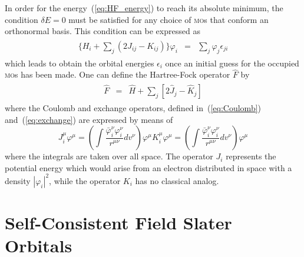 In order for the energy~(\ref{eq:HF_energy}) to reach its absolute
minimum, the condition $\delta E = 0$ must be satisfied for any choice
of \textsc{mo}s that conform an orthonormal basis. This condition can
be expressed as~\cite{Roothaan_HF,Levine_QChem}
%
\begin{eqnarray}
  \begin{split}
    \{H_{i} + \sum\limits_{j} ( 2J_{ij} - K_{ij} ) \} \varphi_{i} & = &
    \sum\limits_{j} \varphi_{j} \epsilon_{ji}
  \end{split}
\label{eq:deltaEzero}
\end{eqnarray}
%
which leads to obtain the orbital energies $\epsilon_{i}$ once an
initial guess for the occupied \textsc{mo}s has been made. One can
define the Hartree-Fock operator $\hat{F}$ by
%
\begin{eqnarray}
  \begin{split}
    \hat{F} & = & \hat{H} +
    \sum\limits_{j} [ 2\hat{J}_{j} - \hat{K}_{j} ]
  \end{split}
  \label{eq:F_operator}
\end{eqnarray}
%
where the Coulomb and exchange operators, defined
in~(\ref{eq:Coulomb}) and~(\ref{eq:exchange}) are expressed by means of
%
\begin{subequations}
  \begin{equation}\label{eq:one_indxJ}
    J_{i}^{\mu} \varphi^{\mu} = \left( \int
    \frac{\bar\varphi_{i}^{\nu} \varphi_{i}^{\nu}}
         {r^{\mu\nu}} dv^{\nu}
         \right) \varphi^{\mu}
  \end{equation}
  \begin{equation}\label{eq:one_indxK}
    K_{i}^{\mu} \varphi^{\mu} = \left( \int
    \frac{\bar\varphi_{i}^{\nu} \varphi_{i}^{\nu}}
         {r^{\mu\nu}} dv^{\nu}
         \right) \varphi^{\mu}
  \end{equation}
\end{subequations}
%
where the integrals are taken over all space. The operator $J_{i}$
represents the potential energy which would arise from an electron
distributed in space with a density $|\varphi_{i}|^{2}$, while the
operator $K_{i}$ has no classical analog.
  




\section{Self-Consistent Field Slater Orbitals}
\label{ch:scf_sto}




